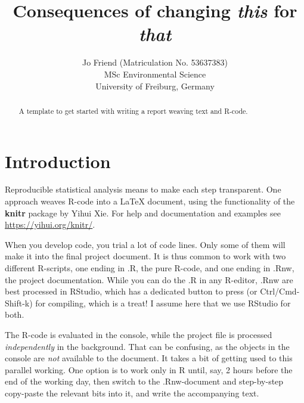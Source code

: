 \documentclass[a4paper, 11pt]{article}\usepackage[]{graphicx}\usepackage[]{color}
\begin{document}



\title{
\normalfont \normalsize 
\huge Consequences of changing \emph{this} for \emph{that} \\ %
}

\author{Jo Friend (Matriculation No. 53637383)\\MSc Environmental Science\\University of Freiburg, Germany}

\maketitle

\tableofcontents


\begin{abstract}
A template to get started with writing a report weaving text and R-code.
\end{abstract}


\section{Introduction}
Reproducible statistical analysis means to make each step transparent. One approach weaves R-code into a \LaTeX\/ document, using the functionality of the \textbf{knitr} package by Yihui Xie. For help and documentation and examples see \url{https://yihui.org/knitr/}.

When you develop code, you trial a lot of code lines. Only some of them will make it into the final project document. It is thus common to work with two different R-scripts, one ending in .R, the pure R-code, and one ending in .Rnw, the project documentation. While you can do the .R in any R-editor, .Rnw are best processed in RStudio, which has a dedicated button to press (or Ctrl/Cmd-Shift-k) for compiling, which is a treat! I assume here that we use RStudio for both.

The R-code is evaluated in the console, while the project file is processed \emph{independently} in the background. That can be confusing, as the objects in the console are \emph{not} available to the document. It takes a bit of getting used to this parallel working. One option is to work only in R until, say, 2 hours before the end of the working day, then switch to the .Rnw-document and step-by-step copy-paste the relevant bits into it, and write the accompanying text. 
\end{document}
